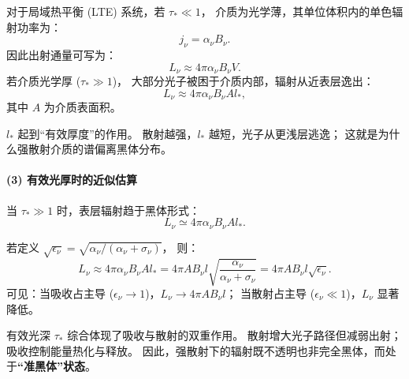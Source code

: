 
对于局域热平衡 (LTE) 系统，若 $\tau_* \ll 1$，
介质为光学薄，其单位体积内的单色辐射功率为：
\[
j_\nu = \alpha_\nu B_\nu.
\]
因此出射通量可写为：
\[
L_\nu \approx 4\pi \alpha_\nu B_\nu V.
\]
若介质光学厚 ($\tau_* \gg 1$)，
大部分光子被困于介质内部，辐射从近表层逸出：
\[
L_\nu \approx 4\pi \alpha_\nu B_\nu A l_*,
\]
其中 $A$ 为介质表面积。

\begin{derivationnote}[]
$l_*$ 起到“有效厚度”的作用。
散射越强，$l_*$ 越短，光子从更浅层逃逸；
这就是为什么强散射介质的谱偏离黑体分布。
\end{derivationnote}

\paragraph{(3) 有效光厚时的近似估算}


当 $\tau_* \gg 1$ 时，表层辐射趋于黑体形式：
\[
L_\nu \simeq 4\pi \alpha_\nu B_\nu A l_*.
\]

若定义 $\sqrt{\epsilon_\nu} = \sqrt{\alpha_\nu / (\alpha_\nu+\sigma_\nu)}$，
则：
\[
L_\nu \approx 4\pi \alpha_\nu B_\nu A l_* 
     = 4\pi A B_\nu l \sqrt{\frac{\alpha_\nu}{\alpha_\nu+\sigma_\nu}}
     = 4\pi A B_\nu l \sqrt{\epsilon_\nu}.
\]
可见：当吸收占主导 ($\epsilon_\nu\!\to\!1$)，$L_\nu\!\to\!4\pi A B_\nu l$；
当散射占主导 ($\epsilon_\nu\!\ll\!1$)，$L_\nu$ 显著降低。

\begin{derivationnote}[]
有效光深 $\tau_*$ 综合体现了吸收与散射的双重作用。  
散射增大光子路径但减弱出射；
吸收控制能量热化与释放。  
因此，强散射下的辐射既不透明也非完全黑体，而处于\textbf{“准黑体”状态}。
\end{derivationnote}
